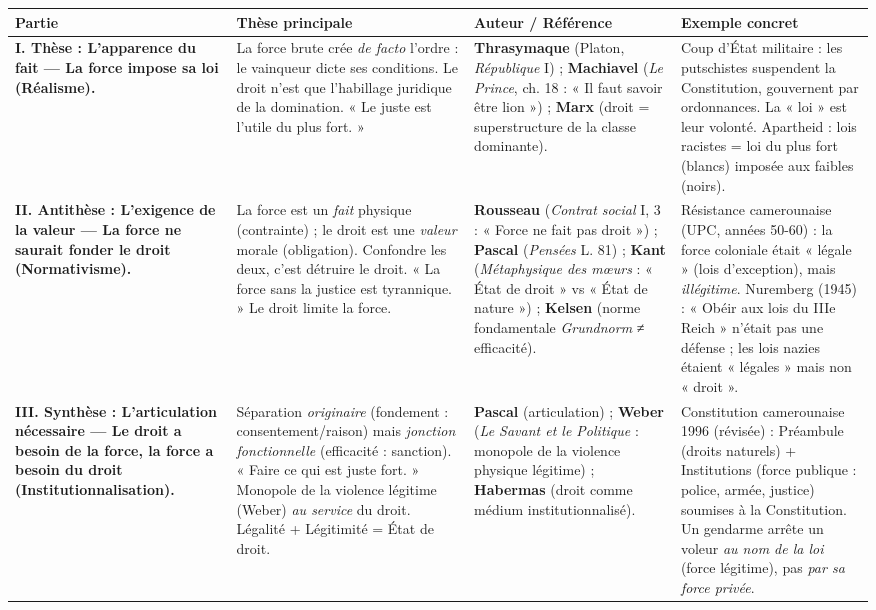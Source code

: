 \documentclass[11pt]{article}
\begin{document}
\begin{corrige}
\begin{center}
\begin{tabularx}{\linewidth}{|l|X|X|X|}
\hline
\rowcolor{popblueL}
\textbf{Partie} & \textbf{Thèse principale} & \textbf{Auteur / Référence} & \textbf{Exemple concret} \\
\hline
\textbf{I. Thèse : L'apparence du fait — La force impose sa loi (Réalisme).} & La force brute crée \emph{de facto} l'ordre : le vainqueur dicte ses conditions. Le droit n'est que l'habillage juridique de la domination. « Le juste est l'utile du plus fort. » & \textbf{Thrasymaque} (Platon, \emph{République} I) ; \textbf{Machiavel} (\emph{Le Prince}, ch. 18 : « Il faut savoir être lion ») ; \textbf{Marx} (droit = superstructure de la classe dominante). & Coup d'État militaire : les putschistes suspendent la Constitution, gouvernent par ordonnances. La « loi » est leur volonté. Apartheid : lois racistes = loi du plus fort (blancs) imposée aux faibles (noirs). \\
\hline
\textbf{II. Antithèse : L'exigence de la valeur — La force ne saurait fonder le droit (Normativisme).} & La force est un \emph{fait} physique (contrainte) ; le droit est une \emph{valeur} morale (obligation). Confondre les deux, c'est détruire le droit. « La force sans la justice est tyrannique. » Le droit limite la force. & \textbf{Rousseau} (\emph{Contrat social} I, 3 : « Force ne fait pas droit ») ; \textbf{Pascal} (\emph{Pensées} L. 81) ; \textbf{Kant} (\emph{Métaphysique des mœurs} : « État de droit » vs « État de nature ») ; \textbf{Kelsen} (norme fondamentale \emph{Grundnorm} ≠ efficacité). & Résistance camerounaise (UPC, années 50-60) : la force coloniale était « légale » (lois d'exception), mais \emph{illégitime}. Nuremberg (1945) : « Obéir aux lois du IIIe Reich » n'était pas une défense ; les lois nazies étaient « légales » mais non « droit ». \\
\hline
\textbf{III. Synthèse : L'articulation nécessaire — Le droit a besoin de la force, la force a besoin du droit (Institutionnalisation).} & Séparation \emph{originaire} (fondement : consentement/raison) mais \emph{jonction fonctionnelle} (efficacité : sanction). « Faire ce qui est juste fort. » Monopole de la violence légitime (Weber) \emph{au service} du droit. Légalité + Légitimité = État de droit. & \textbf{Pascal} (articulation) ; \textbf{Weber} (\emph{Le Savant et le Politique} : monopole de la violence physique légitime) ; \textbf{Habermas} (droit comme médium institutionnalisé). & Constitution camerounaise 1996 (révisée) : Préambule (droits naturels) + Institutions (force publique : police, armée, justice) soumises à la Constitution. Un gendarme arrête un voleur \emph{au nom de la loi} (force légitime), pas \emph{par sa force privée}. \\
\hline
\end{tabularx}
\end{center}


\end{corrige}
\end{document}
